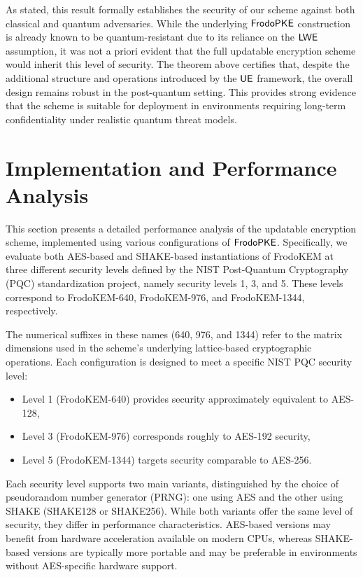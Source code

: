 \documentclass{fundam}
\begin{document}
\noindent As stated, this result formally establishes the security of our scheme against both classical and quantum adversaries. While the underlying $\mathsf{FrodoPKE}$ construction is already known to be quantum-resistant due to its reliance on the $\mathsf{LWE}$ assumption, it was not a priori evident that the full updatable encryption scheme would inherit this level of security. The theorem above certifies that, despite the additional structure and operations introduced by the $\mathsf{UE}$ framework, the overall design remains robust in the post-quantum setting. This provides strong evidence that the scheme is suitable for deployment in environments requiring long-term confidentiality under realistic quantum threat models.



\section{Implementation and Performance Analysis}

This section presents a detailed performance analysis of the updatable encryption scheme, implemented using various configurations of $\mathsf{FrodoPKE}$. Specifically, we evaluate both AES-based and SHAKE-based instantiations of FrodoKEM at three different security levels defined by the {NIST Post-Quantum Cryptography (PQC) standardization project}, namely {security levels 1, 3, and 5}. These levels correspond to FrodoKEM-640, FrodoKEM-976, and FrodoKEM-1344, respectively.

The numerical suffixes in these names (640, 976, and 1344) refer to the matrix dimensions used in the scheme’s underlying lattice-based cryptographic operations. Each configuration is designed to meet a specific NIST PQC security level:
\begin{itemize}
	\item Level 1 (FrodoKEM-640) provides security approximately equivalent to AES-128,
	\item Level 3 (FrodoKEM-976) corresponds roughly to AES-192 security,
	\item Level 5 (FrodoKEM-1344) targets security comparable to AES-256.
\end{itemize}

Each security level supports two main variants, distinguished by the choice of pseudorandom number generator (PRNG): one using AES and the other using SHAKE (SHAKE128 or SHAKE256). While both variants offer the same level of security, they differ in performance characteristics. AES-based versions may benefit from hardware acceleration available on modern CPUs, whereas SHAKE-based versions are typically more portable and may be preferable in environments without AES-specific hardware support.
\end{document}
